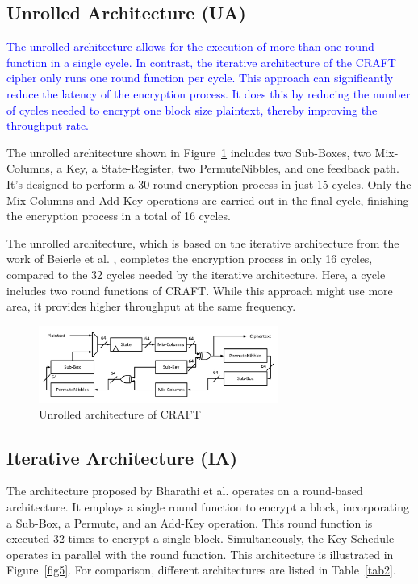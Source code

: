 \documentclass[final,5p,times,twocolumn]{elsarticle}
\begin{document}
\subsection{Unrolled Architecture (UA)}\label{subsec3}

\textcolor{blue}{The unrolled architecture allows for the execution of more than one round function in a single cycle. In contrast, the iterative architecture of the CRAFT cipher only runs one round function per cycle. This approach can significantly reduce the latency of the encryption process. It does this by reducing the number of cycles needed to encrypt one block size plaintext, thereby improving the throughput rate.}

The unrolled architecture shown in Figure~\ref{fig4} includes two Sub-Boxes, two Mix-Columns, a Key, a State-Register, two PermuteNibbles, and one feedback path. It's designed to perform a 30-round encryption process in just 15 cycles. Only the Mix-Columns and Add-Key operations are carried out in the final cycle, finishing the encryption process in a total of 16 cycles.

The unrolled architecture, which is based on the iterative architecture from the work of Beierle et al. \cite{Beierle2019}, completes the encryption process in only 16 cycles, compared to the 32 cycles needed by the iterative architecture. Here, a cycle includes two round functions of CRAFT. While this approach might use more area, it provides higher throughput at the same frequency.


\begin{figure}[h]%
    \centering
    \includegraphics[width=0.7\textwidth]{./fig/unrolled-archticture.pdf}
    \caption{Unrolled architecture of CRAFT}\label{fig4}
\end{figure}

\subsection{Iterative Architecture (IA)}\label{iterative_architecture}

The architecture proposed by Bharathi et al. \cite{Bharathi2022} operates on a round-based architecture.
It employs a single round function to encrypt a block, incorporating a Sub-Box, a Permute, and an Add-Key operation.
This round function is executed 32 times to encrypt a single block. Simultaneously, the Key Schedule operates in parallel with the round function. This architecture is illustrated in Figure~\ref{fig5}.
For comparison, different architectures are listed in Table~\ref{tab2}.
\end{document}
